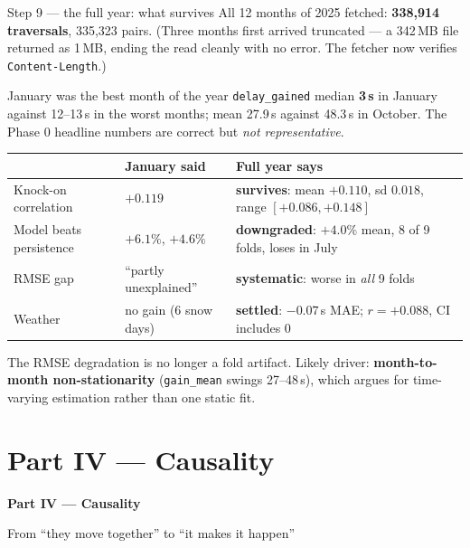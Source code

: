 \documentclass[aspectratio=169,10pt]{beamer}
\newcommand{\srcnote}[1]{{\scriptsize\color{ink3}#1}}
\newcommand{\hl}[1]{{\color{corange}\textbf{#1}}}
\begin{document}
\begin{frame}{Step 9 --- the full year: what survives}
  All 12 months of 2025 fetched: \textbf{338{,}914 traversals}, 335{,}323 pairs.
  \srcnote{(Three months first arrived truncated --- a 342\,MB file returned as 1\,MB,
  ending the read cleanly with no error. The fetcher now verifies \texttt{Content-Length}.)}

  \vspace{0.5em}
  \begin{alertblock}{\small January was the best month of the year}
    \small \texttt{delay\_gained} median \textbf{3\,s} in January against 12--13\,s in the
    worst months; mean 27.9\,s against 48.3\,s in October. The Phase 0 headline numbers are
    correct but \emph{not representative}.
  \end{alertblock}

  \vspace{0.4em}
  \centering
  \begin{tabular}{@{}lll@{}}
    \toprule
    & January said & Full year says \\
    \midrule
    Knock-on correlation & $+0.119$ &
      \textbf{survives}: mean $+0.110$, sd $0.018$, range $[+0.086, +0.148]$ \\
    Model beats persistence & $+6.1\%$, $+4.6\%$ &
      \textbf{downgraded}: $+4.0\%$ mean, 8 of 9 folds, loses in July \\
    RMSE gap & ``partly unexplained'' &
      \textbf{systematic}: worse in \emph{all} 9 folds \\
    Weather & no gain (6 snow days) &
      \textbf{settled}: $-0.07$\,s MAE; $r=+0.088$, CI includes 0 \\
    \bottomrule
  \end{tabular}

  \vspace{0.6em}
  \raggedright\small
  The RMSE degradation is no longer a fold artifact. Likely driver:
  \hl{month-to-month non-stationarity} (\texttt{gain\_mean} swings 27--48\,s), which argues
  for time-varying estimation rather than one static fit.
\end{frame}

\section{Part IV --- Causality}
\begin{frame}[plain]
  \begin{center}\Large\textbf{Part IV --- Causality}\end{center}
  \begin{center}\color{ink2}From ``they move together'' to ``it makes it happen''\end{center}
\end{frame}
\end{document}
